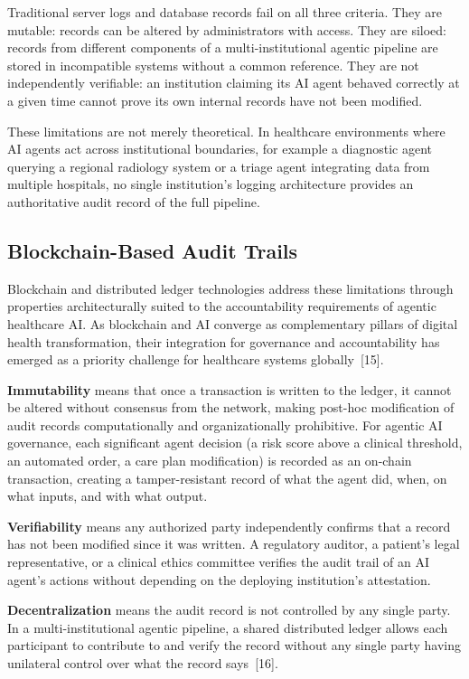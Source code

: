 \documentclass[11pt]{article}
\begin{document}
Traditional server logs and database records fail on all three criteria.
They are mutable: records can be altered by administrators with access.
They are siloed: records from different components of a
multi-institutional agentic pipeline are stored in incompatible systems
without a common reference. They are not independently verifiable: an
institution claiming its AI agent behaved correctly at a given time
cannot prove its own internal records have not been modified.

These limitations are not merely theoretical. In healthcare environments
where AI agents act across institutional boundaries, for example a
diagnostic agent querying a regional radiology system or a triage agent
integrating data from multiple hospitals, no single institution's
logging architecture provides an authoritative audit record of the full
pipeline.

\subsection{Blockchain-Based Audit
Trails}\label{blockchain-based-audit-trails}

Blockchain and distributed ledger technologies address these limitations
through properties architecturally suited to the accountability
requirements of agentic healthcare AI. As blockchain and AI converge as
complementary pillars of digital health transformation, their
integration for governance and accountability has emerged as a priority
challenge for healthcare systems globally~{[}15{]}.

\textbf{Immutability} means that once a transaction is written to the
ledger, it cannot be altered without consensus from the network, making
post-hoc modification of audit records computationally and
organizationally prohibitive. For agentic AI governance, each
significant agent decision (a risk score above a clinical threshold, an
automated order, a care plan modification) is recorded as an on-chain
transaction, creating a tamper-resistant record of what the agent did,
when, on what inputs, and with what output.

\textbf{Verifiability} means any authorized party independently confirms
that a record has not been modified since it was written. A regulatory
auditor, a patient's legal representative, or a clinical ethics
committee verifies the audit trail of an AI agent's actions without
depending on the deploying institution's attestation.

\textbf{Decentralization} means the audit record is not controlled by
any single party. In a multi-institutional agentic pipeline, a shared
distributed ledger allows each participant to contribute to and verify
the record without any single party having unilateral control over what
the record says~{[}16{]}.
\end{document}
